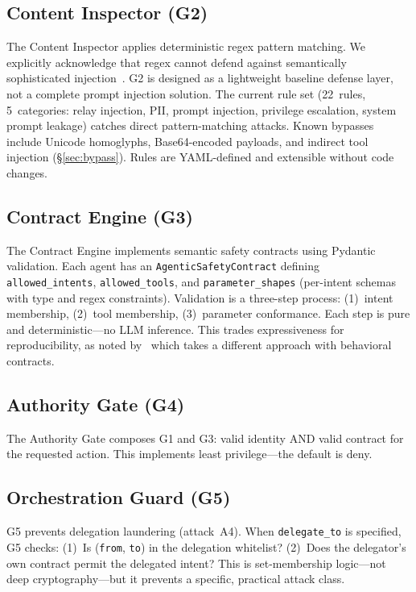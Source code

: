 \documentclass[11pt,a4paper]{article}
\begin{document}
\subsection{Content Inspector (G2)}

The Content Inspector applies deterministic regex pattern matching. We explicitly acknowledge
that regex cannot defend against semantically sophisticated injection~\cite{owasp}. G2 is
designed as a lightweight baseline defense layer, not a complete prompt injection solution. The
current rule set (22~rules, 5~categories: relay injection, PII, prompt injection, privilege
escalation, system prompt leakage) catches direct pattern-matching attacks. Known bypasses
include Unicode homoglyphs,
Base64-encoded payloads, and indirect tool injection (\S\ref{sec:bypass}). Rules are
YAML-defined and extensible without code changes.

\subsection{Contract Engine (G3)}\label{sec:contract}

The Contract Engine implements semantic safety contracts using Pydantic validation. Each agent
has an \texttt{AgenticSafetyContract} defining \texttt{allowed\_intents},
\texttt{allowed\_tools}, and \texttt{parameter\_shapes} (per-intent schemas with type and regex
constraints). Validation is a three-step process: (1)~intent membership, (2)~tool membership,
(3)~parameter conformance. Each step is pure and deterministic---no LLM inference. This trades
expressiveness for reproducibility, as noted by~\cite{agentassert} which takes a different
approach with behavioral contracts.

\subsection{Authority Gate (G4)}

The Authority Gate composes G1 and G3: valid identity AND valid contract for the requested
action. This implements least privilege---the default is deny.

\subsection{Orchestration Guard (G5)}\label{sec:orchestration}

G5 prevents delegation laundering (attack~A4). When \texttt{delegate\_to} is specified, G5
checks: (1)~Is (\texttt{from}, \texttt{to}) in the delegation whitelist? (2)~Does the
delegator's own contract permit the delegated intent? This is set-membership logic---not deep
cryptography---but it prevents a specific, practical attack class.
\end{document}
